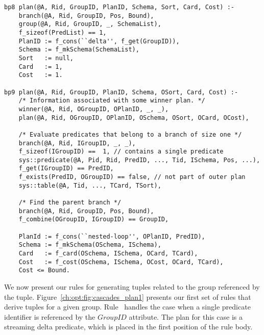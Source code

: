 \begin{figure*}
\ssp
\centering
\begin{lstlisting}
bp8 plan(@A, Rid, GroupID, PlanID, Schema, Sort, Card, Cost) :-
    branch(@A, Rid, GroupID, Pos, Bound),
    group(@A, Rid, GroupID, _, SchemaList),
    f_sizeof(PredList) == 1,
    PlanID := f_cons(``delta'', f_get(GroupID)),
    Schema := f_mkSchema(SchemaList),
    Sort   := null,
    Card   := 1,
    Cost   := 1.

bp9 plan(@A, Rid, GroupID, PlanID, Schema, OSort, Card, Cost) :-
    /* Information associated with some winner plan. */
    winner(@A, Rid, OGroupID, OPlanID, _, _),
    plan(@A, Rid, OGroupID, OPlanID, OSchema, OSort, OCard, OCost),

    /* Evaluate predicates that belong to a branch of size one */
    branch(@A, Rid, IGroupID, _, _),
    f_sizeof(IGroupID) ==  1, // contains a single predicate
    sys::predicate(@A, Pid, Rid, PredID, ..., Tid, ISchema, Pos, ...),
    f_get(IGroupID) == PredID, 
    f_exists(PredID, OGroupID) == false, // not part of outer plan
    sys::table(@A, Tid, ..., TCard, TSort),

    /* Find the parent branch */
    branch(@A, Rid, GroupID, Pos, Bound),
    f_combine(OGroupID, IGroupID) == GroupID,

    PlanId := f_cons(``nested-loop'', OPlanID, PredID),
    Schema := f_mkSchema(OSchema, ISchema),
    Card   := f_card(OSchema, ISchema, OCard, TCard),
    Cost   := f_cost(OSchema, ISchema, OCost, OCard, TCard),
    Cost <= Bound.
\end{lstlisting}
\caption{\label{ch:opt:fig:cascades_plan1} Cascades plan generation rules for event
predicates and nested-loop join method.}
\end{figure*}

We now present our rules for generating  tuples related to the group
referenced by the  tuple.  Figure~\ref{ch:opt:fig:cascades_plan1}
presents our first set of rules that derive  tuples for a given group.
Rule~ handles the case when a single predicate identifier is referenced
by the $GroupID$ attribute.  The plan for this case is a streaming delta
predicate, which is placed in the first position of the rule body.  

